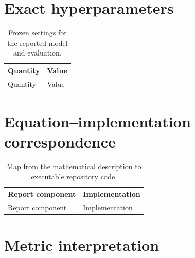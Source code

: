\documentclass[10pt,a4paper]{article}
\begin{document}
\clearpage

\section{Exact hyperparameters}

\begingroup
\small
\begin{longtable}{@{}>{\raggedright\arraybackslash}p{}
>{\raggedright\arraybackslash}p{}@{}}
\caption{Frozen settings for the reported model and evaluation.}
\label{tab:hyperparameters}\\
\toprule
Quantity & Value \\
\midrule
\endfirsthead
\toprule
Quantity & Value \\
\midrule
\endhead

\end{longtable}
\endgroup

\section{Equation--implementation correspondence}

\begingroup
\small
\begin{longtable}{@{}>{\raggedright\arraybackslash}p{}
>{\raggedright\arraybackslash}p{}@{}}
\caption{Map from the mathematical description to executable repository code.}
\label{tab:code-map}\\
\toprule
Report component & Implementation \\
\midrule
\endfirsthead
\toprule
Report component & Implementation \\
\midrule
\endhead

\end{longtable}
\endgroup

\section{Metric interpretation}
\thispagestyle{fancy}
\end{document}
